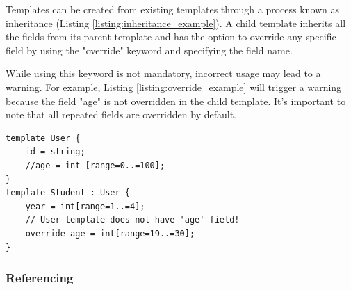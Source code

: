 \documentclass[11pt,a4paper]{article}
\begin{document}
    \par Templates can be created from existing templates through a process 
    known as inheritance (Listing \ref{listing:inheritance_example}). A child template inherits all the fields from its 
    parent template and has the option to override any specific field by using 
    the "override" keyword and specifying the field name. 
    \par While using this keyword is not mandatory, incorrect usage may lead to a warning. 
    For example, Listing \ref{listing:override_example} will trigger a warning because the 
    field "age" is not overridden in the child template. It's important to note that all 
    repeated fields are overridden by default.
    \begin{listing}[h]
        \begin{verbatim}
template User { 
    id = string;
    //age = int [range=0..=100]; 
}
template Student : User {
    year = int[range=1..=4];
    // User template does not have 'age' field!
    override age = int[range=19..=30];
}

        \end{verbatim}
        \caption{Override example}
        \centering
        \label{listing:override_example}
    \end{listing}
    \subsubsection{Referencing}
    \pagebreak
\end{document}
